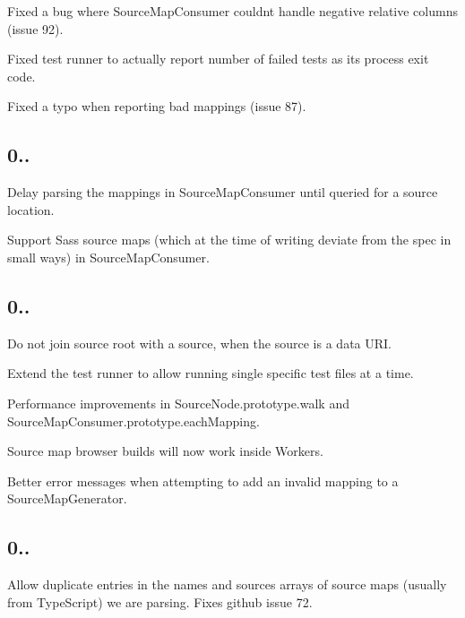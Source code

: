 \begin{DoxyItemize}
\item Fixed a bug where Source\+Map\+Consumer couldn\textquotesingle{}t handle negative relative columns (issue 92).
\item Fixed test runner to actually report number of failed tests as its process exit code.
\item Fixed a typo when reporting bad mappings (issue 87).
\end{DoxyItemize}

\subsection*{0..}


\begin{DoxyItemize}
\item Delay parsing the mappings in Source\+Map\+Consumer until queried for a source location.
\item Support Sass source maps (which at the time of writing deviate from the spec in small ways) in Source\+Map\+Consumer.
\end{DoxyItemize}

\subsection*{0..}


\begin{DoxyItemize}
\item Do not join source root with a source, when the source is a data U\+RI.
\item Extend the test runner to allow running single specific test files at a time.
\item Performance improvements in {\ttfamily Source\+Node.\+prototype.\+walk} and {\ttfamily Source\+Map\+Consumer.\+prototype.\+each\+Mapping}.
\item Source map browser builds will now work inside Workers.
\item Better error messages when attempting to add an invalid mapping to a {\ttfamily Source\+Map\+Generator}.
\end{DoxyItemize}

\subsection*{0..}


\begin{DoxyItemize}
\item Allow duplicate entries in the {\ttfamily names} and {\ttfamily sources} arrays of source maps (usually from Type\+Script) we are parsing. Fixes github issue 72.
\end{DoxyItemize}

